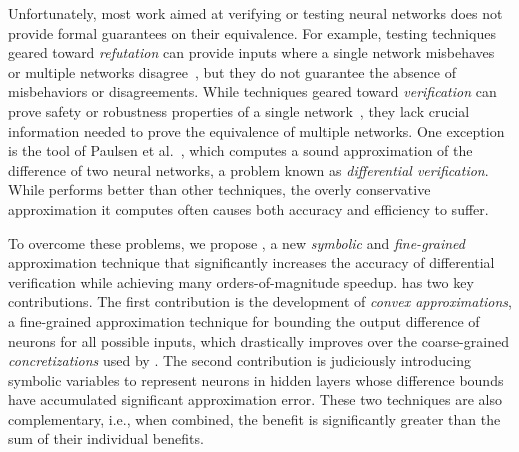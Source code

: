 Unfortunately, most work aimed at verifying or testing neural networks
does not provide formal guarantees on their equivalence.  For example,
testing techniques geared toward \emph{refutation} can provide inputs
where a single network misbehaves~\cite{ma2018deepgauge,
xie2019deephunter, SunWRHKK18, TianPJR18, odena2018tensorfuzz} or
multiple networks disagree~\cite{xie2019diffchaser,PeiCYJ17,MaLLZG18},
but they do not guarantee the absence of misbehaviors or disagreements.
%
While techniques geared toward \emph{verification} can prove safety or
robustness properties of a single
network~\cite{HuangKWW17,Ehlers17,KatzHIJLLSTWZDK19,RuanHK18,
WangPWYJ18nips,SinghGPV19iclr,MirmanGV18,GehrMDTCV18,FischerBDGZV19},
they lack crucial information needed to prove the equivalence of
multiple networks.
%
One exception is the \ReluDiff{} tool of Paulsen et
al.~\cite{paulsen2020reludiff}, which computes a sound approximation of the
difference of two neural networks, a problem known as
\textit{differential verification}.  While \ReluDiff{} performs
better than other techniques, the overly conservative approximation it
computes often causes both accuracy and efficiency to suffer.


To overcome these problems, we propose \Name{}, a new \emph{symbolic}
and \emph{fine-grained} approximation technique that significantly increases the
accuracy of differential verification while achieving many
orders-of-magnitude speedup.
%
\Name{} has two key contributions.  The first contribution is the development
of \emph{convex approximations}, a fine-grained approximation technique
for bounding the output difference of neurons for all possible inputs,
which drastically improves over the
coarse-grained \emph{concretizations} used by \ReluDiff{}.
%
The second contribution is judiciously introducing symbolic variables
to represent neurons in hidden layers whose difference bounds have
accumulated significant approximation error.
%
These two techniques are also complementary, i.e., when combined, the
benefit is significantly greater than the sum of their individual
benefits.




